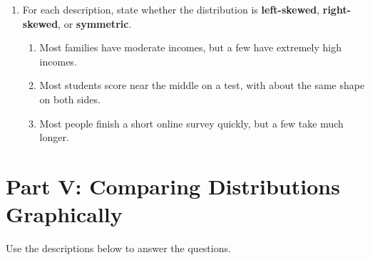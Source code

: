 \documentclass[11pt]{article}
\newcommand{\answerline}{\vspace{1.2cm}}
\begin{document}
\begin{enumerate}[leftmargin=*, label=\textbf{\arabic*.}, start=12]
\item For each description, state whether the distribution is \textbf{left-skewed}, \textbf{right-skewed}, or \textbf{symmetric}.
\begin{enumerate}[label=(\alph*)]
    \item Most families have moderate incomes, but a few have extremely high incomes. \answerline
    \item Most students score near the middle on a test, with about the same shape on both sides. \answerline
    \item Most people finish a short online survey quickly, but a few take much longer. \answerline
\end{enumerate}

\end{enumerate}

\section{Part V: Comparing Distributions Graphically}

Use the descriptions below to answer the questions.
\end{document}
